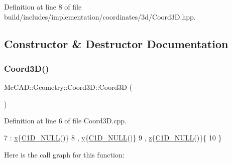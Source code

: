 Definition at line 8 of file build/includes/implementation/coordinates/3d/\+Coord3\+D.\+hpp.



\subsection{Constructor \& Destructor Documentation}
\mbox{\label{classMcCAD_1_1Geometry_1_1Coord3D_a014112083719cc49892fb1a791427fe0}} 
\subsubsection{\texorpdfstring{Coord3\+D()}{Coord3D()}\hspace{0.1cm}{\footnotesize\ttfamily [1/4]}}
{\footnotesize\ttfamily Mc\+C\+A\+D\+::\+Geometry\+::\+Coord3\+D\+::\+Coord3D (\begin{DoxyParamCaption}{ }\end{DoxyParamCaption})}



Definition at line 6 of file Coord3\+D.\+cpp.


\begin{DoxyCode}
7     : \hyperlink{classMcCAD_1_1Geometry_1_1Coord3D_a82467d541e4e330484b7f4d589b433b4}{x}\{\hyperlink{namespaceMcCAD_1_1Geometry_ab581ddc27c8a6530d9c1657b77ffe0bf}{C1D\_NULL}()\}
8     , \hyperlink{classMcCAD_1_1Geometry_1_1Coord3D_af6512434da6e0242b2606e2341abc01d}{y}\{\hyperlink{namespaceMcCAD_1_1Geometry_ab581ddc27c8a6530d9c1657b77ffe0bf}{C1D\_NULL}()\}
9     , \hyperlink{classMcCAD_1_1Geometry_1_1Coord3D_a5f89140bda6825a0a21d0064d05d9f4b}{z}\{\hyperlink{namespaceMcCAD_1_1Geometry_ab581ddc27c8a6530d9c1657b77ffe0bf}{C1D\_NULL}()\}\{
10 \}
\end{DoxyCode}
Here is the call graph for this function\+:
\mbox{\label{classMcCAD_1_1Geometry_1_1Coord3D_ad2eb234f063d45a9d6c5b1937a175ae5}} 
